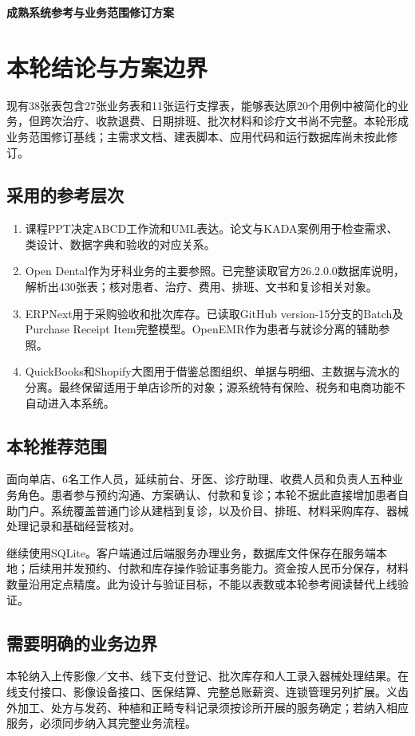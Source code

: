 \documentclass[UTF8,a4paper,zihao=-4,fontset=none]{ctexart}
\begin{document}
\begin{center}
{\Large\bfseries 成熟系统参考与业务范围修订方案}\par
\vspace{0.4em}{\small 第一步：参考核对与范围修订\qquad 2026年10月15日}
\end{center}
\section{本轮结论与方案边界}
现有38张表包含27张业务表和11张运行支撑表，能够表达原20个用例中被简化的业务，但跨次治疗、收款退费、日期排班、批次材料和诊疗文书尚不完整。本轮形成业务范围修订基线；主需求文档、建表脚本、应用代码和运行数据库尚未按此修订。

\subsection{采用的参考层次}
\begin{enumerate}
\item 课程PPT决定ABCD工作流和UML表达。论文与KADA案例用于检查需求、类设计、数据字典和验收的对应关系。
\item Open Dental作为牙科业务的主要参照。已完整读取官方26.2.0.0数据库说明，解析出430张表；核对患者、治疗、费用、排班、文书和复诊相关对象。
\item ERPNext用于采购验收和批次库存。已读取GitHub version-15分支的Batch及Purchase Receipt Item完整模型。OpenEMR作为患者与就诊分离的辅助参照。
\item QuickBooks和Shopify大图用于借鉴总图组织、单据与明细、主数据与流水的分离。最终保留适用于单店诊所的对象；源系统特有保险、税务和电商功能不自动进入本系统。
\end{enumerate}
\subsection{本轮推荐范围}
面向单店、6名工作人员，延续前台、牙医、诊疗助理、收费人员和负责人五种业务角色。患者参与预约沟通、方案确认、付款和复诊；本轮不据此直接增加患者自助门户。系统覆盖普通门诊从建档到复诊，以及价目、排班、材料采购库存、器械处理记录和基础经营核对。

继续使用SQLite。客户端通过后端服务办理业务，数据库文件保存在服务端本地；后续用并发预约、付款和库存操作验证事务能力。资金按人民币分保存，材料数量沿用定点精度。此为设计与验证目标，不能以表数或本轮参考阅读替代上线验证。

\subsection{需要明确的业务边界}
本轮纳入上传影像／文书、线下支付登记、批次库存和人工录入器械处理结果。在线支付接口、影像设备接口、医保结算、完整总账薪资、连锁管理另列扩展。义齿外加工、处方与发药、种植和正畸专科记录须按诊所开展的服务确定；若纳入相应服务，必须同步纳入其完整业务流程。
\end{document}
